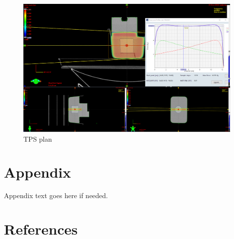 \documentclass[12pt,twoside]{article}   %
\newcommand{\captionv}[3]{\begin{center}\parbox{#1cm}{\caption[#2]{{\sf #3}}}
        \end{center}}
\begin{document}
\begin{figure}[ht]
   \begin{center}
   \includegraphics[width=15
cm]{TPS_images.eps}
   \captionv{12}{TPS plan}
   {TPS plan
   \label{fig_example1} 
    }  %
    \end{center}
\end{figure}

\clearpage


\section*{Appendix}
Appendix text goes here if needed.

\section*{References}
\vspace*{-20mm}


\end{document}
